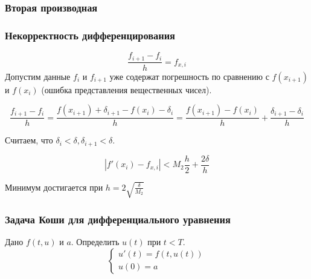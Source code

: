 \documentclass[10pt]{beamer}
\begin{document}
\begin{frame}[fragile]
\frametitle{Вторая производная}
\begin{center}
\end{center}
\end{frame}


\begin{frame}[fragile]
\frametitle{Некорректность дифференцирования}

$$ \frac{f_{i+1} - f_i}{h} =  f_{x, i}$$
Допустим данные $f_i$ и $f_{i+1}$ уже содержат погрешность по сравнению с $f(x_{i+1})$ и $f(x_{i})$ (ошибка представления вещественных чисел).

$$ \frac{f_{i+1} - f_i}{h} = \frac{f(x_{i+1}) + \delta_{i+1} - f(x_i) -\delta_i}{h} = \frac{f(x_{i+1}) - f(x_i)}{h} + \frac{\delta_{i+1} - \delta_i}{h} $$

Считаем, что $\delta_i < \delta, \delta_{i+1} < \delta$.

$$ |f'(x_i) - f_{x, i}| < M_2 \frac{h}{2} + \frac{2 \delta}{h} $$

Минимум достигается при $h = 2 \sqrt{\frac{\delta}{M_2}}$

\end{frame}

\begin{frame}[fragile]
\frametitle{Задача Коши для дифференциального уравнения}
Дано $f(t, u)$ и $a$. Определить $u(t)$ при $t < T$.
$$
\begin{cases}
u'(t) = f(t, u(t))\\
u(0) = a
\end{cases}
$$

\end{frame}
\end{document}
